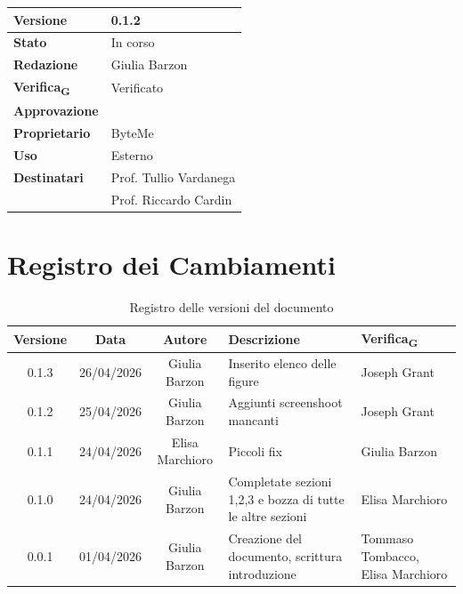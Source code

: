\documentclass[11pt,a4paper]{article}
\newcommand{\gls}[1]{#1\textsubscript{G}}
\begin{document}
\begin{titlepage}
    \begin{table}[H]
        \centering
        \begin{tabular}{|l|p{5cm}|}
            \hline
            \textbf{Versione} & 0.1.2 \\
            \hline
            \textbf{Stato} & In corso\\
            \hline
            \textbf{Redazione} & Giulia Barzon\\
            \hline
            \textbf{\gls{Verifica}} & Verificato \\
            \hline
            \textbf{Approvazione} & \\
            \hline
            \textbf{Proprietario} & ByteMe \\
            \hline
            \textbf{Uso} & Esterno \\
            \hline
            \textbf{Destinatari} & Prof. Tullio Vardanega \\ & Prof. Riccardo Cardin \\
            \hline
        \end{tabular}
    \end{table}
    
    \vfill
\end{titlepage}

\thispagestyle{empty}
\section*{Registro dei Cambiamenti}

\begin{table}[H]
    \centering
    \begin{tabular}{|c|c|c|>{\raggedright\arraybackslash}p{}|p{}|}
        \hline
        \textbf{Versione} & \textbf{Data} & \textbf{Autore} & \textbf{Descrizione} & \textbf{\gls{Verifica}} \\
        \hline
        0.1.3 & 26/04/2026 & Giulia Barzon & Inserito elenco delle figure & Joseph Grant\\
        \hline
        0.1.2 & 25/04/2026 & Giulia Barzon & Aggiunti screenshoot mancanti & Joseph Grant\\
        \hline
        0.1.1 & 24/04/2026 & Elisa Marchioro & Piccoli fix & Giulia Barzon\\
        \hline
        0.1.0 & 24/04/2026 & Giulia Barzon & Completate sezioni 1,2,3 e bozza di tutte le altre sezioni & Elisa Marchioro\\
        \hline
        0.0.1 & 01/04/2026 & Giulia Barzon & Creazione del documento, scrittura introduzione & Tommaso Tombacco, Elisa Marchioro \\
        \hline
    \end{tabular}
    \caption{Registro delle versioni del documento}
    \label{tab:versionamento}
\end{table}
\end{document}
